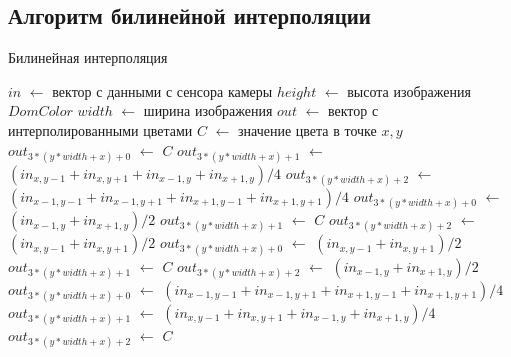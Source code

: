 \subsection{Алгоритм билинейной интерполяции}
\clearpage
\begin{algorithm}[H]
	\caption{Билинейная интерполяция}
	\label{alg:bilin}
	\begin{algorithmic}[1]
		\State $in$ $\gets$ вектор с данными с сенсора камеры
		\State $height$ $\gets$ высота изображения $DomColor$
		\State $width$ $\gets$ ширина изображения
		\State $out$ $\gets$ вектор с интерполированными цветами
			\State $C$ $\gets$ значение цвета в точке $x,y$
					\State $out_{3 * (y * width + x) + 0}$ $\gets$ $C$
					\State $out_{3 * (y * width + x) + 1}$ $\gets$ $(in_{x, y-1} + in_{x, y + 1} + in_{x - 1, y} + in_{x + 1, y}) / 4$
					\State $out_{3 * (y * width + x) + 2}$ $\gets$ $(in_{x-1, y-1} + in_{x-1, y+1} + in_{x+1, y-1} + in_{x+1, y+1}) / 4$
			\EndIf
					\State $out_{3 * (y * width + x) + 0}$ $\gets$ $(in_{x-1, y} + in_{x+1, y}) / 2$
					\State $out_{3 * (y * width + x) + 1}$ $\gets$ $C$
					\State $out_{3 * (y * width + x) + 2}$ $\gets$ $(in_{x, y - 1} + in_{x, y+1}) / 2$
			\EndIf
					\State $out_{3 * (y * width + x) + 0}$ $\gets$ $(in_{x, y - 1} + in_{x, y+1}) / 2$
					\State $out_{3 * (y * width + x) + 1}$ $\gets$ $C$
					\State $out_{3 * (y * width + x) + 2}$ $\gets$ $(in_{x-1, y} + in_{x+1, y}) / 2$
			\EndIf
					\State $out_{3 * (y * width + x) + 0}$ $\gets$ $(in_{x-1, y-1} + in_{x-1, y+1} + in_{x+1, y-1} + in_{x+1, y+1}) / 4$
					\State $out_{3 * (y * width + x) + 1}$ $\gets$ $(in_{x, y-1} + in_{x, y + 1} + in_{x - 1, y} + in_{x + 1, y}) / 4$
					\State $out_{3 * (y * width + x) + 2}$ $\gets$ $C$
			\EndIf
		\EndFor
	\EndFor
	\end{algorithmic}
\end{algorithm}

